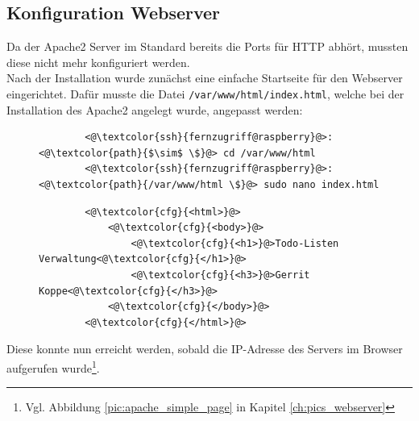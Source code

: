 \documentclass[a4paper, 11pt]{scrartcl}
\begin{document}
\subsection{Konfiguration Webserver}
Da der Apache2 Server im Standard bereits die Ports für HTTP abhört, mussten diese nicht mehr konfiguriert werden.
\\
Nach der Installation wurde zunächst eine einfache Startseite für den Webserver eingerichtet. Dafür musste die Datei
\lstinline[basicstyle={\small\ttfamily\color{black}}]|/var/www/html/index.html|, welche bei der Installation des Apache2 angelegt wurde, angepasst
werden:
\begin{figure}[H]
    \begin{mdframed}[backgroundcolor=bbg]
        \begin{lstlisting}
        <@\textcolor{ssh}{fernzugriff@raspberry}@>:<@\textcolor{path}{$\sim$ \$}@> cd /var/www/html
        <@\textcolor{ssh}{fernzugriff@raspberry}@>:<@\textcolor{path}{/var/www/html \$}@> sudo nano index.html
        \end{lstlisting}
    \end{mdframed}
    \label{lst:index_nano}
\end{figure}
\begin{figure}[H]
    \begin{mdframed}[backgroundcolor=bbg]
        \begin{lstlisting}
        <@\textcolor{cfg}{<html>}@>
            <@\textcolor{cfg}{<body>}@>
                <@\textcolor{cfg}{<h1>}@>Todo-Listen Verwaltung<@\textcolor{cfg}{</h1>}@>
                <@\textcolor{cfg}{<h3>}@>Gerrit Koppe<@\textcolor{cfg}{</h3>}@>
            <@\textcolor{cfg}{</body>}@>
        <@\textcolor{cfg}{</html>}@>
        \end{lstlisting}
    \end{mdframed}
    \label{lst:index_apache2}
\end{figure}
Diese konnte nun erreicht werden, sobald die IP-Adresse des Servers im Browser aufgerufen wurde\footnote{Vgl. Abbildung \ref{pic:apache_simple_page} in Kapitel \ref{ch:pics_webserver}}.
\end{document}
